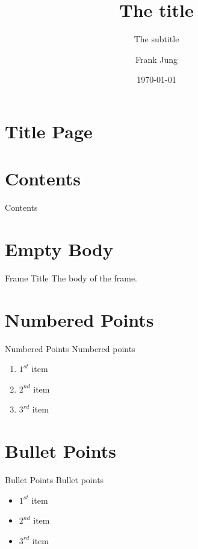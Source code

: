 \documentclass[pdf]{beamer}
\title{The title}
\subtitle{The subtitle}
\author{Frank Jung}
\institute{My Company}
\date{\today}
\begin{document}
\section{Title Page}

\begin{frame}
  \titlepage{}
\end{frame}

\section{Contents}

\begin{frame}{Contents}
  \tableofcontents{}
\end{frame}

\section{Empty Body}

\begin{frame}{Frame Title}
    The body of the frame.
\end{frame}

\section{Numbered Points}

\begin{frame}{Numbered Points}
  Numbered points
  \begin{enumerate}
    \item{} $1^{st}$ item
    \item{} $2^{nd}$ item
    \item{} $3^{rd}$ item
  \end{enumerate}
\end{frame}

\section{Bullet Points}

\begin{frame}{Bullet Points}
  Bullet points
  \begin{itemize}
    \item{} $1^{st}$ item
    \item{} $2^{nd}$ item
    \item{} $3^{rd}$ item
  \end{itemize}
\end{frame}
\end{document}

